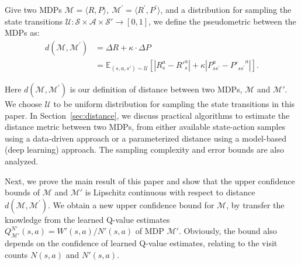 \begin{definition}
\label{def:gobal}
Give two MDPs $\mathcal{M}=\langle R,P\rangle, \ {\mathcal{M}}^{\prime} = \langle {R}^{\prime},{P}^{\prime}\rangle$, and a distribution for sampling the state transitions $\mathcal{U}:\mathcal{S}\times \mathcal{A} \times \mathcal{S}' \rightarrow[0,1]$,
we define the pseudometric between the MDPs
as:
\begin{equation}
\begin{aligned}
d(\mathcal{M},\mathcal{M}^{\prime}) &= \Delta R+ \kappa\cdot \Delta P \\
&= %
\mathbb{E}_{(s,a,s')\sim\mathcal{U}}
\left[|R_s^a-{R}'^{a}_s| + \kappa
|P_{ss^{\prime}}^{a}-{P'_{ss^{\prime}}}^{a} |\right].
\end{aligned} \nonumber
\end{equation}
\end{definition}
Here $d(\mathcal{M},\mathcal{M}^{\prime})$ is our definition of distance between two MDPs, $\mathcal{M}$ and $\mathcal{M}'$. We choose $\mathcal{U}$ to be uniform distribution for sampling the state transitions in this paper. In Section~\ref{sec:distance}, we discuss practical algorithms to estimate the distance metric between two MDPs, from either available state-action samples using a data-driven approach or a parameterized distance using a model-based (deep learning) approach. The sampling complexity and error bounds are also analyzed. 


Next, we prove the main result of this paper and show that the upper confidence bounds of $\mathcal{M}$ and $\mathcal{M}'$ is Lipschitz continuous with respect to distance $d(\mathcal{M},\mathcal{M}^{\prime})$. We obtain a new upper confidence bound for $\mathcal{M}$, by transfer the knowledge from the learned Q-value estimates $Q^{N'}_{\mathcal{M}'}(s,a)=W'(s,a)/N'(s,a)$ of MDP $\mathcal{M}'$. Obviously, the bound also depends on the confidence of learned Q-value estimates, relating to the visit counts $N(s,a)$ and $N'(s,a)$.



